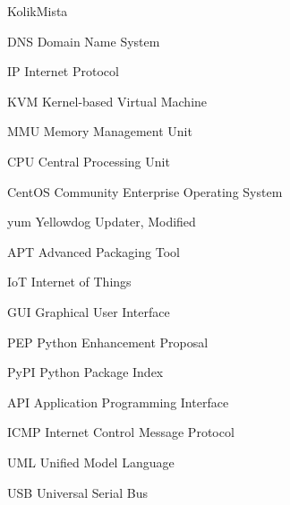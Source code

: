 \begin{seznamzkratek}{KolikMista}

		{DNS}
		{Domain Name System}
		
		{IP}
		{Internet Protocol}
		
		{KVM}
		{Kernel-based Virtual Machine}
		
		{MMU}
		{Memory Management Unit}
		
		{CPU}
		{Central Processing Unit}
		
		{CentOS}
		{Community Enterprise Operating System}


		{yum}
		{Yellowdog Updater, Modified}

		{APT}
		{Advanced Packaging Tool}
		
		{IoT}
		{Internet of Things}

		{GUI}
		{Graphical User Interface}
		
		{PEP}
		{Python Enhancement Proposal}	
		
		{PyPI}
		{Python Package Index}	
		
		{API}
		{Application Programming Interface}		
		
		{ICMP}
		{Internet Control Message Protocol}				

		{UML}
		{Unified Model Language}		
		
		{USB}
		{Universal Serial Bus}	
		

\end{seznamzkratek}
